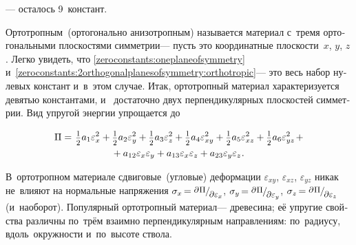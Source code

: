 \begin{otherlanguage}{russian}
\vspace{-0.25em}\noindent --- осталось 9~констант.

Ортотропным~(ортогонально анизотропным) называется материал с~тремя ортогональными плоскостями симметрии\:--- пусть это координатные плоскости~$x$, $y$, $z$.
Легко увидеть, что \eqref{zeroconstants:oneplaneofsymmetry} и~\eqref{zeroconstants:2orthogonalplanesofsymmetry:orthotropic}\:--- это весь набор нулевых констант и~в~этом случае.
Итак, ортотропный материал характеризуется девятью константами, и~ достаточно двух перпендикулярных плоскостей симметрии.
Вид упругой энергии упрощается до

\nopagebreak\vspace{-0.25em}\begin{multline*}
\Pi =^{\mathstrut^{\mathstrut}} \smalldisplaystyleonehalf a_1 \varepsilon^2_{x} + \smalldisplaystyleonehalf a_2 \varepsilon^2_{y} + \smalldisplaystyleonehalf a_3 \varepsilon^2_{z} + \smalldisplaystyleonehalf a_4 \varepsilon^2_{xy} + \smalldisplaystyleonehalf a_5 \varepsilon^2_{xz} + \smalldisplaystyleonehalf a_6 \varepsilon^2_{yz} \hspace{0.25ex} + \\[-0.1em]
%
+ \hspace{0.5ex} a_{12} \varepsilon_{x} \varepsilon_{y} + a_{13} \varepsilon_{x} \varepsilon_{z} + a_{23} \varepsilon_{y} \varepsilon_{z}
\hspace{.1ex} .
\end{multline*}

В~ортотропном материале сдвиговые~(угловые) деформации $\varepsilon_{xy}$, $\varepsilon_{xz}$, $\varepsilon_{yz}$ никак не~влияют на нормальные напряжения ${\sigma_x \hspace{-0.25ex} = \raisemath{.16em}{\scalebox{0.88}{$\partial \hspace{.1ex} \Pi$}} \hspace{-0.1ex} / \hspace{-0.2ex} \raisemath{-0.32em}{\scalebox{0.88}{$\partial \varepsilon_x$}}}$, ${\sigma_y \hspace{-0.25ex} = \raisemath{.16em}{\scalebox{0.88}{$\partial \hspace{.1ex} \Pi$}} \hspace{-0.1ex} / \hspace{-0.2ex} \raisemath{-0.32em}{\scalebox{0.88}{$\partial \varepsilon_y$}}}$, ${\sigma_z \hspace{-0.25ex} = \raisemath{.16em}{\scalebox{0.88}{$\partial \hspace{.1ex} \Pi$}} \hspace{-0.1ex} / \hspace{-0.2ex} \raisemath{-0.32em}{\scalebox{0.88}{$\partial \varepsilon_z$}}}$ (и~наоборот). Популярный ортотропный материал\:--- древесина; её упругие свойства различны по~трём взаимно перпендикулярным направлениям: по~радиусу, вдоль~окружности и~по~высоте ствола.


\end{otherlanguage}

